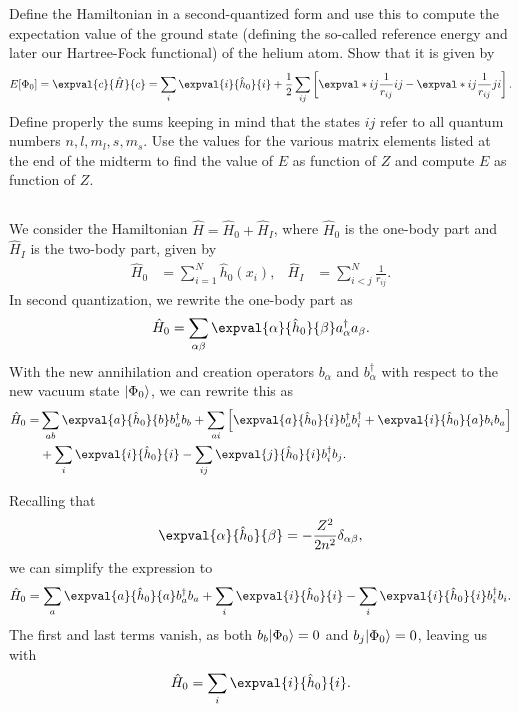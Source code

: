 Define the Hamiltonian in a second-quantized form and use this to compute the expectation value of the ground state (defining the so-called reference energy and later our Hartree-Fock functional) of
the helium atom.
Show that it is given by
\begin{equation}
    E[\Phi_0] = \expval{c}{\hat{H}}{c} = \sum_{i} \expval{i}{\hat{h}_0}{i} + \frac{1}{2} \sum_{ij} \left[\expval*{ij}{\frac{1}{r_{ij}}}{ij} - \expval*{ij}{\frac{1}{r_{ij}}}{ji}\right].
\end{equation}
Define properly the sums keeping in mind that the states $ij$ refer to all quantum numbers $n, l, m_l, s, m_s$.
Use the values for the various matrix elements listed at the end of the midterm to find the value of $E$ as function of $Z$ and compute $E$ as function of $Z$.

\subsection{}
We consider the Hamiltonian $\hat{H} = \hat{H}_0 + \hat{H}_I$, where $\hat{H}_0$ is the one-body part and $\hat{H}_I$ is the two-body part, given by
\begin{align*}
    \hat{H}_0 &= \sum_{i=1}^{N}\hat{h}_0(x_i), &
    \hat{H}_I &= \sum_{i<j}^{N}\frac{1}{r_{ij}}.
\end{align*}
In second quantization, we rewrite the one-body part as
\begin{equation}
    \hat{H}_0 = \sum_{\alpha\beta} \expval{\alpha}{\hat{h}_0}{\beta} a_\alpha^\dagger a_\beta.
\end{equation}
With the new annihilation and creation operators $b_\alpha$ and $b_\alpha^\dagger$ with respect to the new vacuum state $\ket*{\Phi_0}$, we can rewrite this as
\begin{equation}\label{eq:H0_second_quant}
    \begin{split}
        \hat{H}_0 =& \sum_{ab} \expval{a}{\hat{h}_0}{b} b_a^\dagger b_b + \sum_{ai} \left[ \expval{a}{\hat{h}_0}{i} b_a^\dagger b_i^\dagger + \expval{i}{\hat{h}_0}{a} b_i b_a \right] \\
        &+ \sum_{i} \expval{i}{\hat{h}_0}{i} - \sum_{ij} \expval{j}{\hat{h}_0}{i} b_i^\dagger b_j.
    \end{split}
\end{equation}

Recalling that
\begin{equation*}
    \expval{\alpha}{\hat{h}_0}{\beta} = -\frac{Z^2}{2n^2}\delta_{\alpha \beta},
\end{equation*}
we can simplify the expression to
\begin{equation*}
    \hat{H}_0 = \sum_{a} \expval{a}{\hat{h}_0}{a} b_a^\dagger b_a + \sum_{i} \expval{i}{\hat{h}_0}{i} - \sum_{i} \expval{i}{\hat{h}_0}{i} b_i^\dagger b_i.
\end{equation*}
The first and last terms vanish, as both $b_b \ket*{\Phi_0} = 0$ and $b_j \ket*{\Phi_0} = 0$, leaving us with
\begin{equation}
    \hat{H}_0 = \sum_{i} \expval{i}{\hat{h}_0}{i}.
\end{equation}

